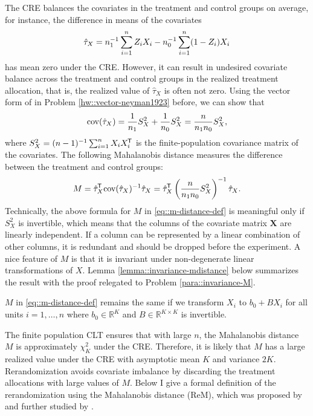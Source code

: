 The CRE balances the covariates in the treatment and control groups on average, for instance, the difference in means of the covariates
$$
\hat{\tau}_X  = n_1^{-1} \sum_{i=1}^n Z_i X_i - n_0^{-1} \sum_{i=1}^n (1-Z_i) X_i
$$
has mean zero under the CRE. However, it can result in undesired covariate balance across the treatment and control groups in the realized treatment allocation, that is, the realized value of $\hat{\tau}_X  $ is often not zero. Using the vector form of \citet{Neyman:1923} in Problem \ref{hw::vector-neyman1923} before, we can show that
$$
\textup{cov}(\hat{\tau}_X  ) 
= \frac{1}{n_1}  S_X^2  + \frac{1}{n_0}  S_X^2   
=  \frac{n}{n_1 n_0} S_X^2   ,
$$
where $ S_X^2   = (n-1)^{-1} \sum_{i=1}^n  X_i X_i^{\mkern-1.5mu\mathsf{T}} $ is the finite-population covariance matrix of the covariates. The following Mahalanobis distance measures the difference between the treatment and control groups:
\begin{equation}
\label{eq::m-distance-def}
M = \hat{\tau}_X \tran \cov(\hat{\tau}_X  )^{-1} \hat{\tau}_X  = \hat{\tau}_X \tran  \left(  \frac{n}{n_1 n_0} S_X^2   \right)^{-1} \hat{\tau}_X  . 
\end{equation}
Technically, the above formula for $M$ in \eqref{eq::m-distance-def} is meaningful only if $S_X^2 $ is invertible, which means that the columns of the covariate matrix $\bm{X}$ are linearly independent. If a column can be represented by a linear combination of other columns, it is redundant and should be dropped before the experiment. 
A nice feature of $M$ is that it is invariant under non-degenerate linear transformations of $X$. Lemma \ref{lemma::invariance-mdistance} below summarizes the result with the proof relegated to Problem \ref{para::invariance-M}. 

\begin{lemma}\label{lemma::invariance-mdistance}
$M$ in \eqref{eq::m-distance-def} remains the same if we transform $X_i$ to $b_0  + BX_i$ for all units $i=1,\ldots, n$ where $b_0  \in \mathbb{R}^K$ and $B \in \mathbb{R}^{K\times K}$ is invertible. 
\end{lemma}




The finite population CLT \citep{li2017general} ensures that with large $n$, the Mahalanobis distance $M $ is approximately $ \chi^2_K$ under the CRE. Therefore, it is likely that $M$ has a large realized value under the CRE with asymptotic mean $K$ and variance $2K$. Rerandomization avoids covariate imbalance by discarding the treatment allocations with large values of $M$. Below I give a formal definition of the rerandomization using the Mahalanobis distance (ReM), which was proposed by \citet{cox:1982} and further studied by \citet{morgan2012rerandomization}. 


